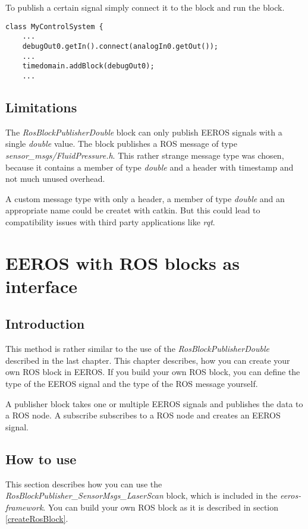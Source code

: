 To publish a certain signal simply connect it to the block and run the block.
\lstset{language=c}
\begin{lstlisting}
class MyControlSystem {
	...
	debugOut0.getIn().connect(analogIn0.getOut());
	...
	timedomain.addBlock(debugOut0);
	...
\end{lstlisting}

\subsection{Limitations}
The \textit{RosBlockPublisherDouble} block can only publish EEROS signals with a single \textit{double} value.
The block publishes a ROS message of type \textit{sensor\_msgs/FluidPressure.h}.
This rather strange message type was chosen, because it contains a member of type \textit{double} and a header with timestamp and not much unused overhead.

A custom message type with only a header, a member of type \textit{double} and an appropriate name could be createt with catkin.
But this could lead to compatibility issues with third party applications like \textit{rqt}.


\section{EEROS with ROS blocks as interface}
\label{rosBlocks}
\subsection{Introduction}
This method is rather similar to the use of the \textit{RosBlockPublisherDouble} described in the last chapter.
This chapter describes, how you can create your own ROS block in EEROS.
If you build your own ROS block, you can define the type of the EEROS signal and the type of the ROS message yourself.

A publisher block takes one or multiple EEROS signals and publishes the data to a ROS node.
A subscribe subscribes to a ROS node and creates an EEROS signal.

\subsection{How to use}
This section describes how you can use the \textit{RosBlockPublisher\_SensorMsgs\_LaserScan} block, which is included in the \textit{eeros-framework}.
You can build your own ROS block as it is described in section \ref{createRosBlock}.

